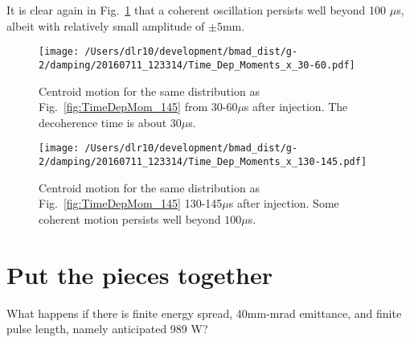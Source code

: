\documentclass[10pt]{report}
\begin{document}
It is clear again in Fig.~\ref{fig:TimeDepMom_130-145} that a coherent oscillation persists well beyond 100 $\mu$s, albeit with relatively small amplitude
of $\pm 5$mm.
\begin{figure}[htbp] %
\begin{minipage}[t]{0.48\textwidth}
   \centering
   \texttt{[image: /Users/dlr10/development/bmad\_dist/g-2/damping/20160711\_123314/Time\_Dep\_Moments\_x\_30-60.pdf]} 
   \caption{Centroid motion for the same distribution as Fig.~\ref{fig:TimeDepMom_145} from 30-60$\mu$s after injection. The
decoherence time is about $30\mu$s. \label{fig:TimeDepMom_30-60}}
 \end{minipage}
\hfill
\begin{minipage}[t]{0.48\textwidth}
\centering
   \texttt{[image: /Users/dlr10/development/bmad\_dist/g-2/damping/20160711\_123314/Time\_Dep\_Moments\_x\_130-145.pdf]} 
\caption{Centroid motion for the same distribution as Fig.~\ref{fig:TimeDepMom_145} 130-145$\mu$s after injection. Some coherent motion persists well beyond $100\mu$s.
   \label{fig:TimeDepMom_130-145}}
\end{minipage}
\end{figure}

\section{Put the pieces together}
What happens if there is finite energy spread, 40mm-mrad emittance, and finite pulse length, namely anticipated 989 W?%
\end{document}
